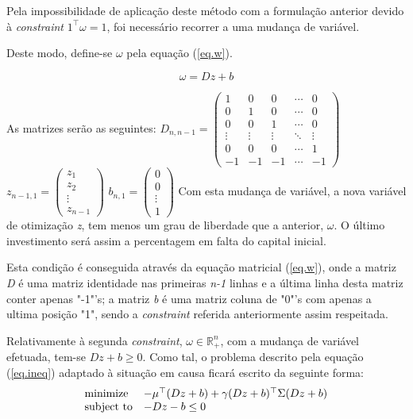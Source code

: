 \documentclass[a4paper]{IEEEtran}
\begin{document}
Pela impossibilidade de aplicação deste método com a formulação anterior devido à \textit{constraint} \: $1^\top\omega=1$, foi necessário recorrer a uma mudança de variável.

Deste modo, define-se $\omega$ pela equação (\ref{eq.w}). 

\begin{equation}
\label{eq.w}
\omega = D z + b
\end{equation}

As matrizes serão as seguintes:
\vskip 4mm
$D_{n,n-1} = 
 \begin{pmatrix}
  1 & 0 & 0 & \cdots & 0 \\
  0 & 1 & 0 & \cdots & 0 \\
  0 & 0 & 1 & \cdots & 0 \\
  \vdots & \vdots & \vdots & \ddots & \vdots \\
  0 & 0 & 0 & \cdots & 1 \\
  -1 & -1 &-1 & \cdots & -1
 \end{pmatrix}
$
\vskip 4mm
$z_{n-1,1} = 
\begin{pmatrix}
  z_{1} \\
  z_{2}\\
  \vdots  \\
  z_{n-1}  
 \end{pmatrix}
$ \: \: \: \: \: \: \:
$
b_{n,1} = 
\begin{pmatrix}
  0 \\
  0\\
  \vdots  \\
  1  
 \end{pmatrix}
$
\vskip 4mm
Com esta mudança de variável, a nova variável de otimização \textit{z}, tem menos um grau de liberdade que a anterior, $\omega$. O último investimento será assim a percentagem em falta do capital inicial. 

Esta condição é conseguida através da equação matricial (\ref{eq.w}), onde a matriz \textit{D} é uma matriz identidade nas primeiras \textit{n-1} linhas e a última linha desta matriz conter apenas "-1"'s; a matriz \textit{b} é uma matriz coluna de "0"'s com  apenas a ultima posição "1", sendo a \textit{constraint} referida anteriormente assim respeitada.

Relativamente à segunda \textit{constraint}, $\omega \in \mathbb{R}_+^n$, com a mudança de variável efetuada, tem-se $D z + b \geq 0$. Como tal, o problema descrito pela equação (\ref{eq.ineq}) adaptado à situação em causa ficará escrito da seguinte forma:
\begin{equation}
\label{eq.subs}
\begin{array}[t]{ll} \text{minimize} & -\mu^\top (D z + b) + \gamma (D z + b)^\top \Sigma (D z + b) \\
\text{subject to} & -D z - b \leq 0 \end{array}
\end{equation}
\end{document}

